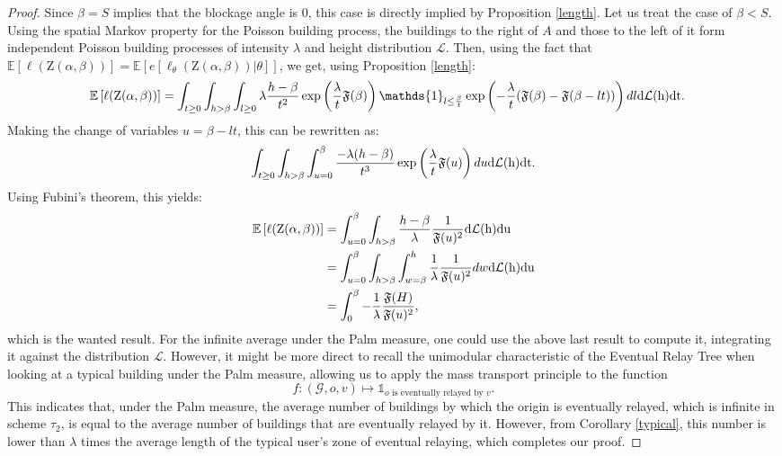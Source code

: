 \documentclass[10pt,english,a4paper]{smfart}
\theoremstyle{definition}
\theoremstyle{remark}
\newcommand{\primi}{\mathfrak{F}}
\newcommand{\zone}{\mathrm{Z}}
\newcommand{\e}{\mathbb{E}}
\begin{document}
\begin{proof}
Since $\beta=S$ implies that the blockage angle is $0$, this case is directly implied by Proposition \ref{length}. Let us treat the case of $\beta<S$.\\
Using the spatial Markov property for the Poisson building process, the buildings to the right of $A$ and those to the left of it form independent Poisson building processes of intensity $\lambda$ and height distribution $\mathcal{L}$. Then, using the fact that $\e[\ell(\zone(\alpha, \beta))] =\e[e[\ell_\theta(\zone(\alpha, \beta))|\theta]]$, we get, using Proposition \ref{length}:
\begin{align*}
    \e \left[ \ell(\zone(\alpha, \beta))\right] &= \int_{t\geq 0}\int_{h> \beta}\int_{l\geq 0}\lambda\frac{h-\beta}{t^2}\exp \left(\frac{\lambda}{t}\primi(\beta)\right)\mathds{1}_{l\leq \frac{\beta}{t}}\exp \left(-\frac{\lambda}{t}(\primi(\beta)-\primi(\beta-lt))\right) dl \rm{d}\mathcal{L}(h) dt.
\end{align*}
Making the change of variables $u = \beta-lt$, this can be rewritten as:
\[\int_{t\geq 0} \int_{h> \beta}\int_{u=0}^{\beta} \frac{-\lambda (h-\beta)}{t^3}\exp\left(\frac{\lambda}{t}\primi(u)\right)  du \rm{d}\mathcal{L}(h) dt.\]
Using Fubini's theorem, this yields:
\begin{align*}
    \e \left[  \ell(\zone(\alpha, \beta))\right]&= \int_{u=0}^{\beta} \int_{h>\beta}\frac{h-\beta}{\lambda}\frac{1}{\primi(u)^2}\rm{d}\mathcal{L}(h)\rm{d}u\\
    &= \int_{u=0}^{\beta} \int_{h>\beta}\int_{w=\beta}^{h}\frac{1}{\lambda}\frac{1}{\primi(u)^2}dw \rm{d}\mathcal{L}(h)\rm{d}u\\
    &= \int_{0}^{\beta} -\frac{1}{\lambda}\frac{\primi(H)}{\primi(u)^2},
\end{align*}
which is the wanted result. For the infinite average under the Palm measure, one could use the above last result to compute it, integrating it against the distribution $\mathcal{L}$. However, it might be more direct to recall the unimodular characteristic of the Eventual Relay Tree when looking at a typical building under the Palm measure, allowing us to apply the mass transport principle to the function
\[f:(\mathcal{G}, o, v)\mapsto \mathds{1}_{o \text{ is eventually relayed by } v}.\]
This indicates that, under the Palm measure, the average number of buildings by which the origin is eventually relayed, which is infinite in scheme $\tau_2$, is equal to the average number of buildings that are eventually relayed by it. However, from Corollary \ref{typical}, this number is lower than $\lambda$ times the average length of the typical user's zone of eventual relaying, which completes our proof.
\end{proof}
\end{document}
